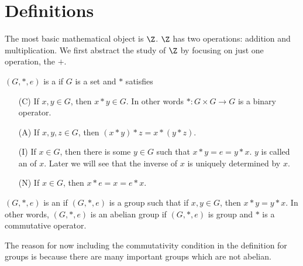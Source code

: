 \section{Definitions}

The most basic mathematical object is $\Z$.
$\Z$ has two operations: addition and multiplication.
We first abstract the study of $\Z$ by focusing on just one operation, the $+$.

\begin{defn}
  $(G, *, e)$ is a
  if $G$ is a set and $*$ satisfies
  \begin{enumerate}[nosep]
  \item[(C)] If $x, y \in G$, then $x * y \in G$. In other words $*: G \times G \rightarrow G$ is a binary operator.
  \item[(A)] If $x, y, z \in G$, then $(x * y) * z = x * (y * z)$.
  \item[(I)] If $x\in G$, then there is some $y \in G$ such that $x * y = e = y * x$.
    $y$ is called an  of $x$.
    Later we will see that the inverse of $x$ is uniquely determined by $x$.
  \item[(N)] If $x \in G$, then $x * e = x = e * x$.
  \end{enumerate}
\end{defn}

\begin{defn}
  $(G, *, e)$ is an  if $(G, *, e)$ is a group such that
  if $x,y \in G$, then $x * y = y * x$.
  In other words, $(G, *, e)$ is an abelian group if
  $(G, *, e)$ is group and $*$ is a commutative operator.
\end{defn}

The reason for now including the commutativity condition in the definition for groups is because
there are many important groups which are not abelian.
